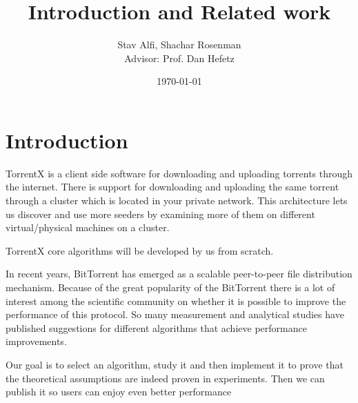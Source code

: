 \documentclass[11pt]{article}
\title{{\Huge   Introduction and Related work}}
\author{Stav Alfi, Shachar Rosenman\\{\small Advisor: Prof. Dan Hefetz}}
\date{\today}
\begin{document}
  \maketitle

  \section*{Introduction}
  \begin{flushleft}

    TorrentX is a client side software for downloading and uploading torrents through the internet.
    There is support for downloading and uploading the same torrent through a cluster which is located in your private network. This architecture lets  us discover and use more seeders by examining more of them on different virtual/physical machines on a cluster.

  \end{flushleft}
  \begin{flushleft}

    TorrentX core algorithms will be developed by us from scratch.

  \end{flushleft}
  \begin{flushleft}

    In recent years, BitTorrent has emerged as a scalable peer-to-peer file distribution mechanism.
    Because of the great popularity of the BitTorrent there is a lot of interest among the scientific community on whether it is possible to improve the performance of this protocol.
    So many measurement and analytical studies have published suggestions for different algorithms that achieve performance improvements.

  \end{flushleft}
  \begin{flushleft}

    Our goal is to select an algorithm, study it and then implement it to prove that the theoretical assumptions are indeed proven in experiments. Then we can publish it so users can enjoy even better performance
  \end{flushleft}
\end{document}
